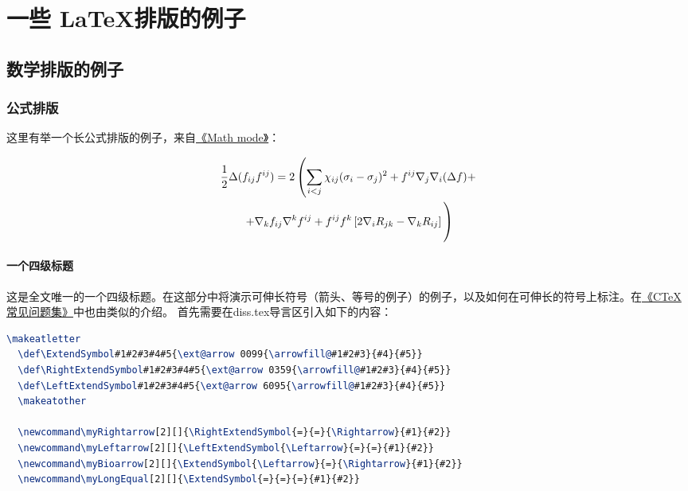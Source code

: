 
\chapter{一些 \LaTeX 排版的例子}
\label{chap:example}

\section{数学排版的例子}
\label{sec:matheq}

\subsection{公式排版}
\label{sec:eqformat}

这里有举一个长公式排版的例子，来自\href{http://www.tex.ac.uk/tex-archive/info/math/voss/mathmode/Mathmode.pdf}{《Math mode》}：

\begin {multline}
  \frac {1}{2}\Delta (f_{ij}f^{ij})=
  2\left (\sum _{i<j}\chi _{ij}(\sigma _{i}-
    \sigma _{j}) ^{2}+ f^{ij}\nabla _{j}\nabla _{i}(\Delta f)+\right .\\
  \left .+\nabla _{k}f_{ij}\nabla ^{k}f^{ij}+
    f^{ij}f^{k}\left [2\nabla _{i}R_{jk}-
      \nabla _{k}R_{ij}\right ]\vphantom {\sum _{i<j}}\right )
\end{multline}

\subsubsection{一个四级标题}
\label{sec:depth4}

这是全文唯一的一个四级标题。在这部分中将演示可伸长符号（箭头、等号的例子）的例子，以及如何在可伸长的符号上标注。在\href{http://zhou63.ahut.edu.cn/latex/ctexfaq.pdf}{《CTeX常见问题集》}中也由类似的介绍。
首先需要在diss.tex导言区引入如下的内容：

\begin{lstlisting}[language={TeX}, caption={插入导言区的内容}]
  \makeatletter
  \def\ExtendSymbol#1#2#3#4#5{\ext@arrow 0099{\arrowfill@#1#2#3}{#4}{#5}}
  \def\RightExtendSymbol#1#2#3#4#5{\ext@arrow 0359{\arrowfill@#1#2#3}{#4}{#5}}
  \def\LeftExtendSymbol#1#2#3#4#5{\ext@arrow 6095{\arrowfill@#1#2#3}{#4}{#5}}
  \makeatother
  
  \newcommand\myRightarrow[2][]{\RightExtendSymbol{=}{=}{\Rightarrow}{#1}{#2}}
  \newcommand\myLeftarrow[2][]{\LeftExtendSymbol{\Leftarrow}{=}{=}{#1}{#2}}
  \newcommand\myBioarrow[2][]{\ExtendSymbol{\Leftarrow}{=}{\Rightarrow}{#1}{#2}}
  \newcommand\myLongEqual[2][]{\ExtendSymbol{=}{=}{=}{#1}{#2}}
\end{lstlisting}

